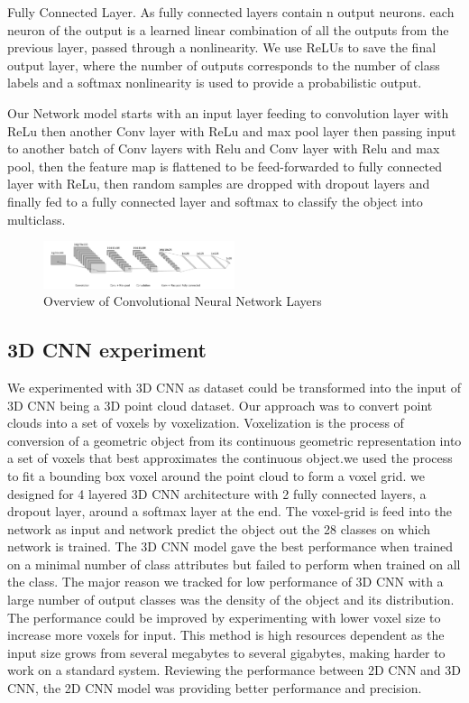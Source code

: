 Fully Connected Layer.
As fully connected layers contain n output neurons.
each neuron of the output is a learned linear combination of all the outputs from the previous layer,
passed through a nonlinearity.
We use ReLUs to save the final output layer, where the number of outputs corresponds
to the number of class labels and a softmax nonlinearity is used to provide a probabilistic output.


Our Network model starts with an input layer feeding to convolution layer with ReLu then
another Conv layer with ReLu and max pool layer then passing input to another batch of Conv layers
with Relu and Conv layer with Relu and max pool, then the feature map is flattened to be feed-forwarded to
fully connected layer with ReLu, then random samples are dropped with dropout layers
and finally fed to a fully connected layer and softmax to classify the object into multiclass.

\begin{figure}[!h]
     \begin{center}
       \includegraphics[width=0.5\textwidth]{./images/object_net.pdf}
       \caption{Overview of Convolutional Neural Network Layers}
       \label{fig:cnn}
     \end{center}
\end{figure}

\subsection{3D CNN experiment}
We experimented with 3D CNN as dataset could be transformed into the
input of 3D CNN being a 3D point cloud dataset. Our approach was to convert point clouds into a set of voxels by voxelization. Voxelization is the process of conversion of a geometric object from its
continuous geometric representation into a set of voxels that best approximates the continuous object.we used the process to fit a bounding box voxel around the point cloud to form a voxel grid. we designed for 4 layered 3D CNN architecture with 2 fully connected layers, a dropout layer, around a softmax layer at the end. The voxel-grid is feed into the network as input and network predict the object out the 28 classes on which network is trained. The 3D CNN model gave the best performance when trained on a minimal number of class attributes but failed to perform when trained on all the class. The major reason we tracked for low performance of 3D CNN with a large number of output classes was the
density of the object and its distribution.
The performance could be improved by experimenting with lower voxel size to increase more voxels for input. This method is high resources dependent as the input size grows from several megabytes to several gigabytes, making harder to work on a standard system. Reviewing the performance between 2D CNN and 3D CNN, the 2D CNN model was providing better performance and precision.
